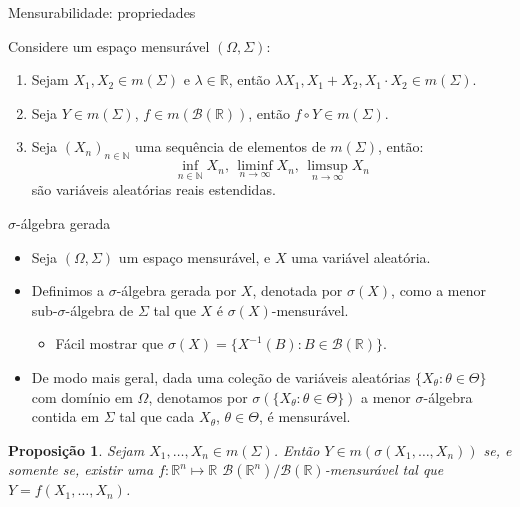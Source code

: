 \documentclass[11pt]{beamer}
\newtheorem{proposition}{Proposição}
\begin{document}
\begin{frame}{Mensurabilidade: propriedades}
	\begin{lemma}
		Considere um espaço mensurável $(\Omega, \Sigma)$:
		\begin{enumerate}
			\item Sejam $X_1,X_2 \in m(\Sigma)$ e $\lambda \in \mathbb{R}$, então $\lambda X_1, X_1 + X_2, X_1 \cdot X_2 \in m(\Sigma)$.
			\item Seja $Y \in m(\Sigma)$, $f \in m(\mathcal{B}(\mathbb{R}))$, então $f\circ Y  \in m(\Sigma)$.
			\item Seja $(X_n)_{n\in \mathbb{N}}$ uma sequência de elementos de $m(\Sigma)$, então:
				$$\inf_{n \in \mathbb{N}} X_n,\, \liminf_{n\to \infty} X_n,\, \limsup_{n \to \infty}X_n$$ 
				são variáveis aleatórias reais estendidas.
			\end{enumerate}
		\end{lemma}
	\end{frame}


\begin{frame}{$\sigma$-álgebra gerada}
	\begin{itemize}
		\item 	Seja $(\Omega, \Sigma )$ um espaço mensurável, e $X$ uma variável aleatória.
		\item Definimos a $\sigma$-álgebra gerada por $X$, denotada por $\sigma(X)$, como a menor sub-$\sigma$-álgebra de $\Sigma$ tal que $X$ é $\sigma(X)$-mensurável.
		\begin{itemize}
			\item Fácil mostrar que $\sigma(X) = \{X^{-1}(B): B \in \mathcal{B}(\mathbb{R})\}$.
		\end{itemize}
		\item De modo mais geral, dada uma coleção de variáveis aleatórias $\{X_\theta: \theta \in \Theta\}$ com domínio em $\Omega$, denotamos por $\sigma(\{X_\theta: \theta \in \Theta\})$ a menor $\sigma$-álgebra contida em $\Sigma$ tal que cada $X_\theta$, $\theta \in \Theta$, é mensurável.
		
			\end{itemize}
\begin{proposition}
	Sejam $X_1,\ldots, X_n \in m(\Sigma)$. Então $Y \in m(\sigma(X_1,\ldots, X_n))$ se, e somente se, existir uma $f: \mathbb{R}^n \mapsto \mathbb{R}$ $\mathcal{B}(\mathbb{R}^n)\slash \mathcal{B}(\mathbb{R})$-mensurável tal que $Y = f(X_1,\ldots, X_n)$.
\end{proposition}

\end{frame}
\end{document}
